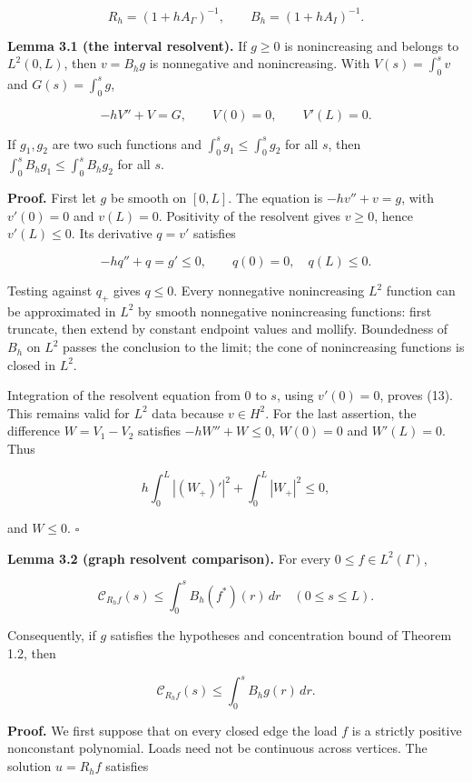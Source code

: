 \documentclass[11pt]{article}
\begin{document}
\[
R_h=(1+hA_\Gamma)^{-1},
\qquad B_h=(1+hA_I)^{-1}.
\tag{12}
\]

\textbf{Lemma 3.1 (the interval resolvent).} If \(g\ge0\) is
nonincreasing and belongs to \(L^2(0,L)\), then \(v=B_hg\) is
nonnegative and nonincreasing. With \(V(s)=\int_0^s v\) and
\(G(s)=\int_0^s g\),

\[
-hV''+V=G,
\qquad V(0)=0,\qquad V'(L)=0.
\tag{13}
\]

If \(g_1,g_2\) are two such functions and
\(\int_0^s g_1\le\int_0^s g_2\) for all \(s\), then
\(\int_0^s B_hg_1\le\int_0^s B_hg_2\) for all \(s\).

\textbf{Proof.} First let \(g\) be smooth on \([0,L]\). The equation is
\(-hv''+v=g\), with \(v'(0)=0\) and \(v(L)=0\). Positivity of the
resolvent gives \(v\ge0\), hence \(v'(L)\le0\). Its derivative \(q=v'\)
satisfies

\[
-hq''+q=g'\le0,\qquad q(0)=0,\quad q(L)\le0.
\tag{14}
\]

Testing against \(q_+\) gives \(q\le0\). Every nonnegative nonincreasing
\(L^2\) function can be approximated in \(L^2\) by smooth nonnegative
nonincreasing functions: first truncate, then extend by constant
endpoint values and mollify. Boundedness of \(B_h\) on \(L^2\) passes
the conclusion to the limit; the cone of nonincreasing functions is
closed in \(L^2\).

Integration of the resolvent equation from \(0\) to \(s\), using
\(v'(0)=0\), proves (13). This remains valid for \(L^2\) data because
\(v\in H^2\). For the last assertion, the difference \(W=V_1-V_2\)
satisfies \(-hW''+W\le0\), \(W(0)=0\) and \(W'(L)=0\). Thus

\[
h\int_0^L|(W_+)'|^2+\int_0^L|W_+|^2\le0,
\tag{15}
\]

and \(W\le0\). \(\square\)

\textbf{Lemma 3.2 (graph resolvent comparison).} For every
\(0\le f\in L^2(\Gamma)\),

\[
\mathcal C_{R_hf}(s)\le\int_0^s B_h(f^*)(r)\,dr
\quad(0\le s\le L).
\tag{16}
\]

Consequently, if \(g\) satisfies the hypotheses and concentration bound
of Theorem 1.2, then

\[
\mathcal C_{R_hf}(s)\le\int_0^s B_hg(r)\,dr.
\tag{17}
\]

\textbf{Proof.} We first suppose that on every closed edge the load
\(f\) is a strictly positive nonconstant polynomial. Loads need not be
continuous across vertices. The solution \(u=R_hf\) satisfies
\end{document}
